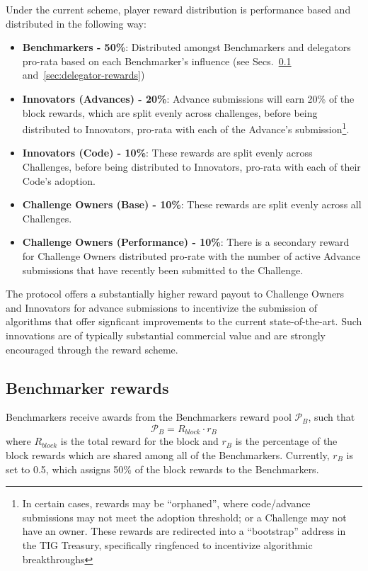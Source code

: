 \documentclass{contract}
\numberwithin{equation}{section}
\begin{document}
Under the current scheme, player reward distribution is performance based and distributed in the following way:
\begin{itemize}
    \item \textbf{Benchmarkers - 50\%}: Distributed amongst Benchmarkers and delegators pro-rata based on each Benchmarker's influence (see Secs.~\ref{sec:benchmarker-rewards} and~\ref{sec:delegator-rewards})
    \item \textbf{Innovators (Advances) - 20\%}: Advance submissions will earn 20\% of the block rewards, which are split evenly across challenges, before being distributed to Innovators, pro-rata with each of the Advance's submission\footnote{In certain cases, rewards may be ``orphaned'', where code/advance submissions may not meet the adoption threshold; or a Challenge may not have an owner. These rewards are redirected into a ``bootstrap'' address in the TIG Treasury, specifically ringfenced to incentivize algorithmic breakthroughs}.
    \item \textbf{Innovators (Code) - 10\%}: These rewards are split evenly across Challenges, before being distributed to Innovators, pro-rata with each of their Code's adoption\footnotemark[1].
    \item \textbf{Challenge Owners (Base) - 10\%}: These rewards are split evenly across all Challenges\footnotemark[1].
    \item \textbf{Challenge Owners (Performance) - 10\%}: There is a secondary reward for Challenge Owners distributed pro-rate with the number of active Advance submissions that have recently been submitted to the Challenge\footnotemark[1]. 
\end{itemize}

The protocol offers a substantially higher reward payout to Challenge Owners and Innovators for advance submissions to incentivize the submission of algorithms that offer signficant improvements to the current state-of-the-art.
Such innovations are of typically substantial commercial value and are strongly encouraged through the reward scheme. 

\subsection{Benchmarker rewards}
\label{sec:benchmarker-rewards}
Benchmarkers receive awards from the Benchmarkers reward pool $\mathcal{P}_B$, such that 
\begin{equation}
    \mathcal{P}_B = R_{block} \cdot r_B
\end{equation}
where $R_{block}$ is the total reward for the block and $r_B$ is the percentage of the block rewards which are shared among all of the Benchmarkers. 
Currently, $r_B$ is set to 0.5, which assigns 50\% of the block rewards to the Benchmarkers. 
\end{document}
